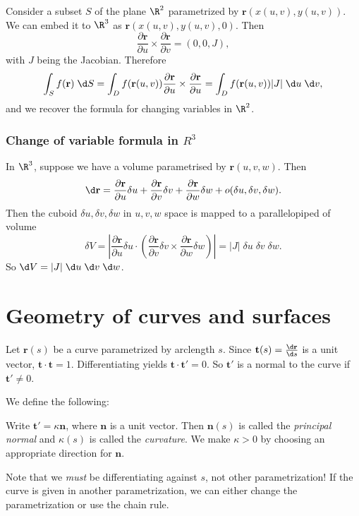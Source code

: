 \documentclass[a4paper]{article}
\begin{document}
Consider a subset $S$ of the plane $\R^2$ parametrized by $\mathbf{r}(x(u, v), y(u, v))$. We can embed it to $\R^3$ as $\mathbf{r}(x(u, v), y(u, v), 0)$. Then
\[
  \frac{\partial \mathbf{r}}{\partial u}\times \frac{\partial\mathbf{r}}{\partial v} = (0, 0, J),
\]
with $J$ being the Jacobian.
Therefore 
\[
  \int_S f(\mathbf{r})\;\d S = \int_D f(\mathbf{r}(u, v)) \frac{\partial \mathbf{r}}{\partial u}\times \frac{\partial \mathbf{r}}{\partial u} = \int_D f(\mathbf{r}(u, v))|J|\;\d u\;\d v,
\]
and we recover the formula for changing variables in $\R^2$.

\subsubsection*{Change of variable formula in \texorpdfstring{$R^3$}{R3}}
In $\R^3$, suppose we have a volume parametrised by $\mathbf{r}(u, v, w)$. Then
\[
  \d \mathbf{r} = \frac{\partial \mathbf{r}}{\partial u}\delta u + \frac{\partial \mathbf{r}}{\partial v}\delta v + \frac{\partial \mathbf{r}}{\partial w}\delta w + o(\delta u, \delta v, \delta w).
\]
Then the cuboid $\delta u, \delta v, \delta w$ in $u, v, w$ space is mapped to a parallelopiped of volume
\[
  \delta V = \left|\frac{\partial \mathbf{r}}{\partial u}\delta u\cdot \left( \frac{\partial \mathbf{r}}{\partial v}\delta v \times \frac{\partial \mathbf{r}}{\partial w}\delta w\right)\right| = |J|\;\delta u\; \delta v\;\delta w.
\]
So $\d V = |J|\; \d u\; \d v\; \d w$.

\section{Geometry of curves and surfaces}
Let $\mathbf{r}(s)$ be a curve parametrized by arclength $s$. Since $\mathbf{t}(s) = \frac{\d \mathbf{r}}{\d s}$ is a unit vector, $\mathbf{t}\cdot \mathbf{t} = 1$. Differentiating yields $\mathbf{t}\cdot \mathbf{t}' = 0$. So $\mathbf{t}'$ is a normal to the curve if $\mathbf{t}' \not= 0$.

We define the following:
\begin{defi}
  Write $\mathbf{t}' = \kappa \mathbf{n}$, where $\mathbf{n}$ is a unit vector. Then $\mathbf{n}(s)$ is called the \emph{principal normal} and $\kappa(s)$ is called the \emph{curvature}. We make $\kappa > 0$ by choosing an appropriate direction for $\mathbf{n}$.
\end{defi}
Note that we \emph{must} be differentiating against $s$, not other parametrization! If the curve is given in another parametrization, we can either change the parametrization or use the chain rule.
\end{document}
